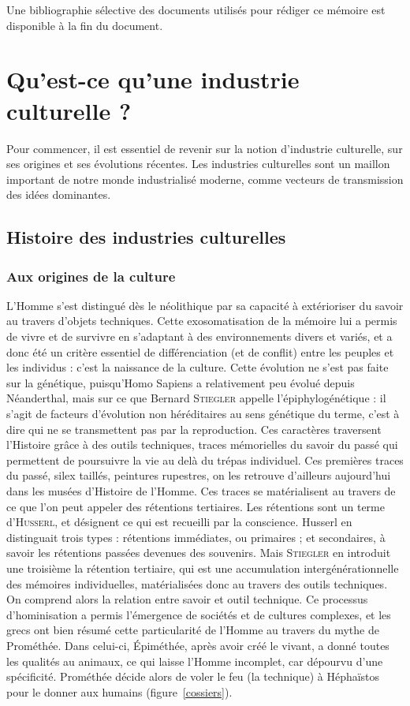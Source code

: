 \documentclass[a4paper,14pt]{extreport}
\begin{document}
Une bibliographie sélective des documents utilisés pour rédiger ce mémoire est disponible à la fin du document.

\chapter{Qu'est-ce qu'une industrie culturelle ?}

Pour commencer, il est essentiel de revenir sur la notion d'industrie culturelle, sur ses origines et ses évolutions récentes. Les industries culturelles sont un maillon important de notre monde industrialisé moderne, comme vecteurs de transmission des idées dominantes.

\section{Histoire des industries culturelles}

\subsection{Aux origines de la culture}

L'Homme s'est distingué dès le néolithique par sa capacité à extérioriser du savoir au travers d'objets techniques. Cette exosomatisation de la mémoire lui a permis de vivre et de survivre en s'adaptant à des environnements divers et variés, et a donc été un critère essentiel de différenciation (et de conflit) entre les peuples et les individus : c'est la naissance de la culture. Cette évolution ne s'est pas faite sur la génétique, puisqu'Homo Sapiens a relativement peu évolué depuis Néanderthal, mais sur ce que Bernard \textsc{Stiegler} appelle l'épiphylogénétique : il s'agit de facteurs d'évolution non héréditaires au sens génétique du terme, c'est à dire qui ne se transmettent pas par la reproduction. Ces caractères traversent l'Histoire grâce à des outils techniques, traces mémorielles du savoir du passé qui permettent de poursuivre la vie au delà du trépas individuel. Ces premières traces du passé, silex taillés, peintures rupestres, on les retrouve d'ailleurs aujourd'hui dans les musées d'Histoire de l'Homme. Ces traces se matérialisent au travers de ce que l'on peut appeler des rétentions tertiaires. Les rétentions sont un terme d'\textsc{Husserl}, et désignent ce qui est recueilli par la conscience. Husserl en distinguait trois types : rétentions immédiates, ou primaires ; et secondaires, à savoir les rétentions passées devenues des souvenirs. Mais \textsc{Stiegler} en introduit une troisième la rétention tertiaire, qui est une accumulation intergénérationnelle des mémoires individuelles, matérialisées donc au travers des outils techniques. On comprend alors la relation entre savoir et outil technique. Ce processus d'hominisation a permis l'émergence de sociétés et de cultures complexes, et les grecs ont bien résumé cette particularité de l'Homme au travers du mythe de Prométhée. Dans celui-ci, Épiméthée, après avoir créé le vivant, a donné toutes les qualités au animaux, ce qui laisse l'Homme incomplet, car dépourvu d'une spécificité. Prométhée décide alors de voler le feu (la technique) à Héphaïstos pour le donner aux humains (figure~\ref{cossiers}). 
\end{document}
